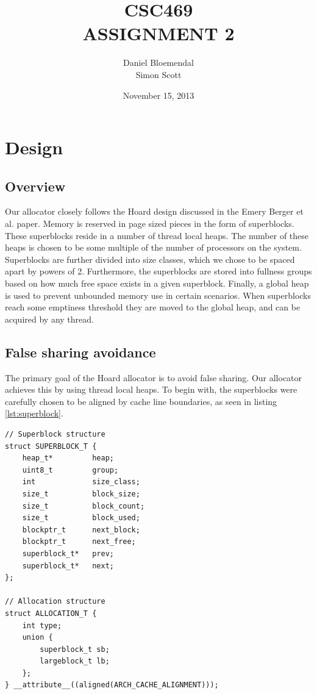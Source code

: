 \documentclass[oneside]{amsart}
\theoremstyle{definition}
\theoremstyle{remark}
\numberwithin{equation}{section}
\begin{document}
\title[CSC469 A2]{CSC469\\ASSIGNMENT 2}
\author{Daniel Bloemendal\\ Simon Scott}
\date{November 15, 2013}

\begin{titlepage}
\maketitle
\thispagestyle{empty}
\tableofcontents
\end{titlepage}

\section{Design}
\subsection{Overview}
Our allocator closely follows the Hoard design discussed in the Emery Berger et al. paper. Memory is
reserved in page sized pieces in the form of superblocks. These superblocks reside in a number of
thread local heaps. The number of these heaps is chosen to be some multiple of the number of
processors on the system. Superblocks are further divided into size classes, which we chose to be
spaced apart by powers of 2. Furthermore, the superblocks are stored into fullness groups based on
how much free space exists in a given superblock. Finally, a global heap is used to prevent
unbounded memory use in certain scenarios. When superblocks reach some emptiness threshold they are
moved to the global heap, and can be acquired by any thread.

\subsection{False sharing avoidance}
The primary goal of the Hoard allocator is to avoid false sharing. Our allocator achieves this by
using thread local heaps. To begin with, the superblocks were carefully chosen to be aligned by
cache line boundaries, as seen in listing \ref{lst:superblock}.
\begin{lstlisting}
// Superblock structure
struct SUPERBLOCK_T {
    heap_t*         heap;
    uint8_t         group;
    int             size_class;
    size_t          block_size;
    size_t          block_count;
    size_t          block_used;
    blockptr_t      next_block;
    blockptr_t      next_free;
    superblock_t*   prev;
    superblock_t*   next;
};

// Allocation structure
struct ALLOCATION_T {
    int type;
    union {
        superblock_t sb;
        largeblock_t lb;
    };
} __attribute__((aligned(ARCH_CACHE_ALIGNMENT)));
\end{lstlisting}
\end{document}
